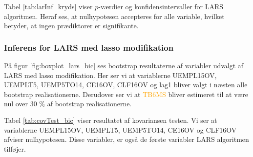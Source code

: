 Tabel \ref{tab:larInf_kryds} viser \(p\)-værdier og konfidensintervaller for LARS algoritmen. 
Heraf ses, at nulhypotesen accepteres for alle variable, hvilket betyder, at ingen prædiktorer er signifikante.



\subsubsection{Inferens for LARS med lasso modifikation}
På figur \ref{fig:boxplot_lars_bic} ses bootstrap resultaterne af variabler udvalgt af LARS med lasso modifikation. 
Her ser vi at variablerne \textcolor{blue3}{UEMPL15OV}, \textcolor{blue3}{UEMPLT5}, \textcolor{blue3}{UEMP5TO14}, \textcolor{blue3}{CE16OV}, \textcolor{blue3}{CLF16OV} og \textcolor{blue3}{lag1} bliver valgt i næsten alle bootstrap realisationerne. Derudover ser vi at \textcolor{orange}{TB6MS} bliver estimeret til at være nul over 30 \% af bootstrap realisationerne. 

Tabel \ref{tab:covTest_bic} viser resultatet af  kovariansen testen. Vi ser at variablerne \textcolor{blue3}{UEMPL15OV}, \textcolor{blue3}{UEMPLT5}, \textcolor{blue3}{UEMP5TO14}, \textcolor{blue3}{CE16OV} og \textcolor{blue3}{CLF16OV} afviser nulhypotesen. 
Disse variabler, er også de første variabler LARS algoritmen tilføjer.  

